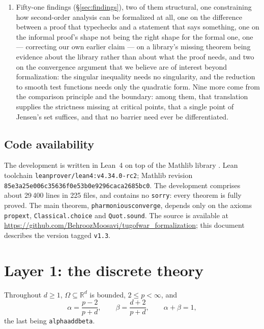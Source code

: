 \documentclass[11pt,reqno]{amsart}
\newcommand{\LEANREF}[1]{\texttt{\small\def\_{\textunderscore\allowbreak}#1}}
\newcommand{\R}{\mathbb{R}}
\theoremstyle{plain}
\theoremstyle{definition}
\begin{document}
\begin{enumerate}
  \item Fifty-one findings (\S\ref{sec:findings}), two of them structural,
        one constraining how second-order analysis can be formalized at all,
        one on the difference between a proof that typechecks and a statement
        that says something, one on the informal proof's shape not being the
        right shape for the formal one, one --- correcting our own earlier
        claim --- on a library's missing theorem being evidence about the
        library rather than about what the proof needs, and two on the
        convergence argument that we believe are of interest beyond
        formalization: the singular inequality needs no singularity, and the
        reduction to smooth test functions needs only the quadratic form. Nine
        more come from the comparison principle and the boundary: among them,
        that translation supplies the strictness missing at critical points,
        that a single point of Jensen's set suffices, and that no barrier need
        ever be differentiated.
\end{enumerate}

\subsection{Code availability}

The development is written in Lean~4 \cite{dMU21} on top of the Mathlib
library \cite{Mathlib20}. Lean toolchain
\texttt{leanprover/lean4:v4.34.0-rc2}; Mathlib revision
\texttt{85e3a25e006c35636f0e53b0e9296caca2685bc0}. The development
comprises about 29\,400 lines in 225 files, and contains no
\LEANREF{sorry}: every theorem is fully proved. The main theorem,
\LEANREF{pharmonious\_converge}, depends only on the axioms
\LEANREF{propext}, \LEANREF{Classical.choice} and \LEANREF{Quot.sound}. The source
is available at
\url{https://github.com/BehroozMoosavi/tugofwar_formalization}; this document
describes the version tagged \texttt{v1.3}.

\section{Layer 1: the discrete theory}\label{sec:layer1}

Throughout $d \ge 1$, $\Omega \subseteq \R^d$ is bounded, $2 \le p < \infty$,
and
\begin{equation}\label{eq:weights}
  \alpha = \frac{p-2}{p+d}, \qquad \beta = \frac{d+2}{p+d},
  \qquad \alpha + \beta = 1,
\end{equation}
the last being \LEANREF{alpha\_add\_beta}.
\end{document}
